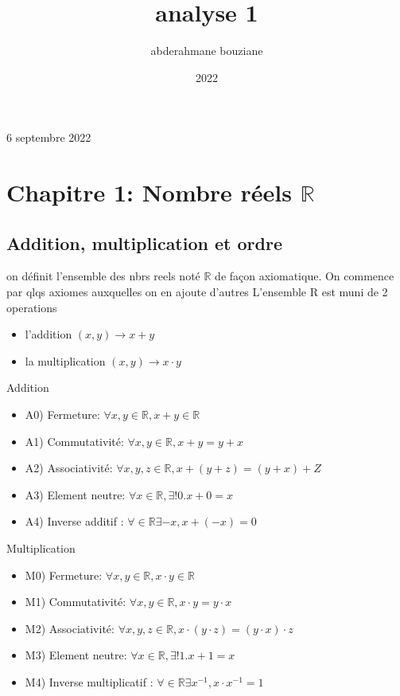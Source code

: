 \documentclass{article}
\title{analyse 1}
\author{abderahmane bouziane}
\date{2022}
\newcommand{\reals}{\mathbb{R}}
\begin{document}
\maketitle

6 septembre 2022

\section{Chapitre 1: Nombre réels $\reals$}

\subsection{Addition, multiplication et ordre}
on définit l'ensemble des nbrs reels noté $\reals$ de façon axiomatique.
On commence par qlqs axiomes auxquelles on en ajoute d’autres
L'ensemble R est muni de 2 operations

\begin{itemize}
    \item l'addition $(x, y) \rightarrow x + y$
    \item la multiplication $(x, y) \rightarrow x \cdot y$
\end{itemize}

Addition
\begin{itemize}
    \item A0) Fermeture: $\forall x, y \in \reals, x + y \in \reals$
    \item A1) Commutativité: $\forall x, y \in \reals, x + y = y + x$
    \item A2) Associativité: $\forall x, y, z \in \reals, x + (y + z) = (y + x) + Z$
    \item A3) Element neutre: $\forall x \in \reals, \exists! 0. x + 0 = x$
    \item A4) Inverse additif : $\forall \in \reals \exists -x, x + (-x) = 0$
\end{itemize}

Multiplication
\begin{itemize}
    \item M0) Fermeture: $\forall x, y \in \reals, x \cdot y \in \reals$
    \item M1) Commutativité: $\forall x, y \in \reals, x \cdot y = y \cdot x$
    \item M2) Associativité: $\forall x, y, z \in \reals, x \cdot (y \cdot z) = (y \cdot x) \cdot z$
    \item M3) Element neutre: $\forall x \in \reals, \exists! 1. x + 1 = x$
    \item M4) Inverse multiplicatif : $\forall \in \reals \exists x^{-1}, x \cdot x^{-1} = 1$
\end{itemize}
\end{document}
